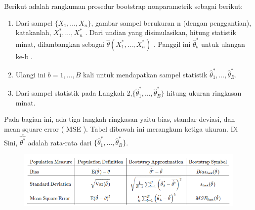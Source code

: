 \documentclass[
]{book}
\begin{document}
Berikut adalah rangkuman prosedur bootstrap nonparametrik sebagai berikut:

\begin{enumerate}
\def\labelenumi{\arabic{enumi}.}
\item
  Dari sampel \(\{X_1, \ldots, X_n\}\), gambar sampel berukuran n (dengan penggantian), katakanlah, \(X_1^*, \ldots, X_n^*\) . Dari undian yang disimulasikan, hitung statistik minat, dilambangkan sebagai \(\hat{\theta}(X_1^*, \ldots, X_n^*)\) . Panggil ini \(\hat{\theta}_b^*\) untuk ulangan ke-b .
\item
  Ulangi ini \(b=1, \ldots, B\) kali untuk mendapatkan sampel statistik \(\hat{\theta}_1^*, \ldots,\hat{\theta}_B^*\).
\item
  Dari sampel statistik pada Langkah 2,\(\{\hat{\theta}_1^*, \ldots, \hat{\theta}_B^*\}\) hitung ukuran ringkasan minat.
\end{enumerate}

Pada bagian ini, ada tiga langkah ringkasan yaitu bias, standar deviasi, dan mean square error ( MSE ). Tabel dibawah ini merangkum ketiga ukuran. Di Sini, \(\overline{\hat{\theta^*}}\) adalah rata-rata dari \(\{\hat{\theta}_1^*, \ldots,\hat{\theta}_B^*\}\).

\begin{figure}

{\centering \includegraphics[width=1\linewidth]{images/6.2.1-3} 

}

\end{figure}
\end{document}
